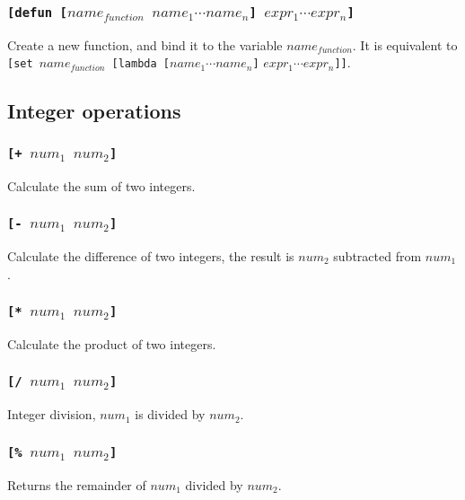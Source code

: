 \subsubsection{\tt{[defun [}$name_{function}$ $name_1 \cdots name_n$\tt{]} $expr_1 \cdots expr_n$\tt{]}}
Create a new function, and bind it to the variable $name_{function}$. It is equivalent to {\tt{[set }}$name_{function}${\tt{ [lambda [}}$name_1 \cdots name_n${\tt{]}} $expr_1 \cdots expr_n${\tt{]]}}.


\subsection{Integer operations}
\subsubsection{\tt{[+ }$num_1$ $num_2$\tt{]}}
Calculate the sum of two integers.
\subsubsection{\tt{[- }$num_1$ $num_2$\tt{]}}
Calculate the difference of two integers, the result is $num_2$ subtracted from $num_1$.
\subsubsection{\tt{[* }$num_1$ $num_2$\tt{]}}
Calculate the product of two integers.
\subsubsection{\tt{[/ }$num_1$ $num_2$\tt{]}}
Integer division, $num_1$ is divided by $num_2$.
\subsubsection{\tt{[\% }$num_1$ $num_2$\tt{]}}
Returns the remainder of $num_1$ divided by $num_2$.


